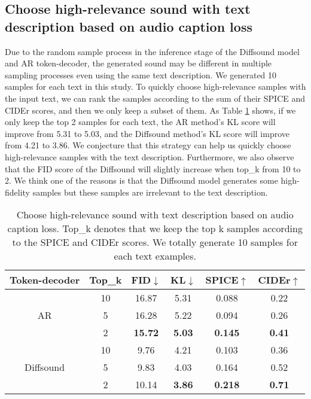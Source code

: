 \documentclass[lettersize,journal]{IEEEtran}
\begin{document}
\subsection{Choose high-relevance sound with text description based on audio caption loss}
Due to the random sample process in the inference stage of the Diffsound model and AR token-decoder, the generated sound may be different in multiple sampling processes even using the same text description. We generated 10 samples for each text in this study. To quickly choose high-relevance samples with the input text, we can rank the samples according to the sum of their SPICE and CIDEr scores, and then we only keep a subset of them. As Table \ref{tab:my-table7} shows, if we only keep the top 2 samples for each text, the AR method's KL score will improve from 5.31 to 5.03, and the Diffsound method's KL score will improve from 4.21 to 3.86. We conjecture that this strategy can help us quickly choose high-relevance samples with the text description. Furthermore, we also observe that the FID score of the Diffsound will slightly increase when top\_k from 10 to 2. We think one of the reasons is that the Diffsound model generates some high-fidelity samples but these samples are irrelevant to the text description.
\begin{table}[t] \centering
\caption{Choose high-relevance sound with text description based on audio caption loss. Top\_k denotes that we keep the top k samples according to the SPICE and CIDEr scores. We totally generate 10 samples for each text examples.}
\label{tab:my-table7}
\begin{tabular}{cccccc}
\hline
Token-decoder     & Top\_k & FID$\downarrow$ & KL$\downarrow$ & SPICE$\uparrow$ & CIDEr$\uparrow$ \\ \hline
\multicolumn{1}{c|}{\multirow{3}{*}{AR}}        & 10     & 16.87 & 5.31 & 0.088 & 0.22  \\
\multicolumn{1}{c|}{}                           & 5      & 16.28 & 5.22 & 0.094 & 0.26  \\
\multicolumn{1}{c|}{}                           & 2       & \textbf{15.72}     & \textbf{5.03}    & \textbf{0.145}    & \textbf{0.41}  \\ \hline
\multicolumn{1}{c|}{\multirow{3}{*}{Diffsound}} & 10     & 9.76  & 4.21 & 0.103 & 0.36  \\
\multicolumn{1}{c|}{}                           & 5      & 9.83  & 4.03 & 0.164 & 0.52  \\
\multicolumn{1}{c|}{}                           & 2     & 10.14   & \textbf{3.86}   & \textbf{0.218}      & \textbf{0.71}   \\ \hline
\end{tabular}
\end{table}
\end{document}
